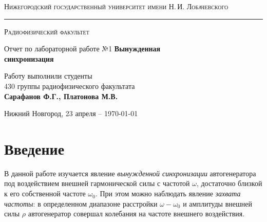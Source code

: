 \documentclass[a4paper,14pt]{extarticle}
\def\labauthors{Сарафанов Ф.Г., Платонова М.В.}
\def\labnumber{1}
\begin{document}
\begin{titlepage}
\begin{center}
{\small\textsc{Нижегородский государственный университет имени Н.\,И. Лобачевского}}
\vskip 2pt \hrule \vskip 3pt
{\small\textsc{Радиофизический факультет}}

\vfill


{{\large Отчет по лабораторной работе №\labnumber}\vskip 12pt {\Huge \bfseries Вынужденная \\[10pt] синхронизация}}

	
\vspace{2cm}
{\large Работу выполнили студенты \\[-0.25em] 430 группы радиофизического факультата \\[0.5em] {\Large \bfseries \labauthors}}



\end{center}

\vfill
	
	
	
\begin{center}
	{Нижний Новгород, 23 апреля -- \today}
\end{center}

\end{titlepage}
\tableofcontents
\newpage





\section*{Введение}

В данной работе изучается явление \textit{вынужденной синхронизации}  автогенератора под воздействием внешней гармонической силы с частотой $\omega$, достаточно близкой к его собственной частоте $\omega_0$. При этом можно наблюдать явление \textit{захвата частоты}: в определенном диапазоне расстройки $\omega-\omega_0$ и амплитуды внешней силы $\rho$ автогенератор совершал колебания на частоте внешнего воздействия.
\end{document}
